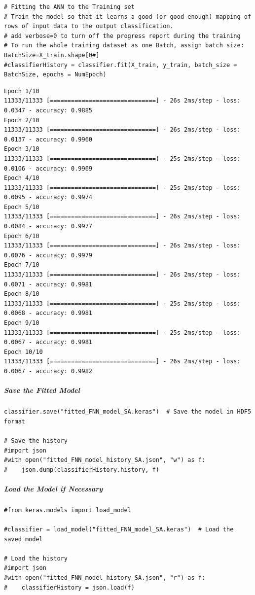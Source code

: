 \begin{verbatim}
# Fitting the ANN to the Training set
# Train the model so that it learns a good (or good enough) mapping of rows of input data to the output classification.
# add verbose=0 to turn off the progress report during the training
# To run the whole training dataset as one Batch, assign batch size: BatchSize=X_train.shape[0#]
#classifierHistory = classifier.fit(X_train, y_train, batch_size = BatchSize, epochs = NumEpoch)
\end{verbatim}

\begin{verbatim}
Epoch 1/10
11333/11333 [==============================] - 26s 2ms/step - loss: 0.0347 - accuracy: 0.9885
Epoch 2/10
11333/11333 [==============================] - 26s 2ms/step - loss: 0.0137 - accuracy: 0.9960
Epoch 3/10
11333/11333 [==============================] - 25s 2ms/step - loss: 0.0106 - accuracy: 0.9969
Epoch 4/10
11333/11333 [==============================] - 25s 2ms/step - loss: 0.0095 - accuracy: 0.9974
Epoch 5/10
11333/11333 [==============================] - 26s 2ms/step - loss: 0.0084 - accuracy: 0.9977
Epoch 6/10
11333/11333 [==============================] - 26s 2ms/step - loss: 0.0076 - accuracy: 0.9979
Epoch 7/10
11333/11333 [==============================] - 26s 2ms/step - loss: 0.0071 - accuracy: 0.9981
Epoch 8/10
11333/11333 [==============================] - 25s 2ms/step - loss: 0.0068 - accuracy: 0.9981
Epoch 9/10
11333/11333 [==============================] - 25s 2ms/step - loss: 0.0067 - accuracy: 0.9981
Epoch 10/10
11333/11333 [==============================] - 26s 2ms/step - loss: 0.0067 - accuracy: 0.9982
\end{verbatim}

\subparagraph{Save the Fitted Model}

\begin{verbatim}
classifier.save("fitted_FNN_model_SA.keras")  # Save the model in HDF5 format

# Save the history
#import json
#with open("fitted_FNN_model_history_SA.json", "w") as f:
#    json.dump(classifierHistory.history, f)
\end{verbatim}

\subparagraph{Load the Model if Necessary}

\begin{verbatim}
#from keras.models import load_model

#classifier = load_model("fitted_FNN_model_SA.keras")  # Load the saved model

# Load the history
#import json
#with open("fitted_FNN_model_history_SA.json", "r") as f:
#    classifierHistory = json.load(f)
\end{verbatim}


